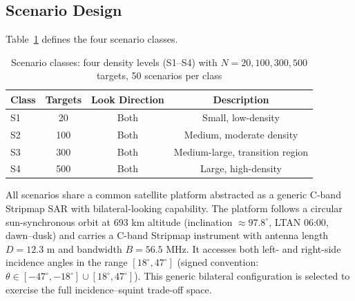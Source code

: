 \documentclass[preprint,12pt,authoryear]{elsarticle}
\begin{document}
\subsection{Scenario Design}
Table~\ref{tab:scenarios} defines the four scenario classes.
\begin{table}[H]
\centering
\caption{Scenario classes: four density levels (S1--S4) with $N = 20, 100, 300, 500$ targets, 50 scenarios per class}
\label{tab:scenarios}
\begin{tabular}{lccc}
\toprule
\textbf{Class} & \textbf{Targets} & \textbf{Look Direction} & \textbf{Description} \\
\midrule
S1 & 20  & Both & Small, low-density \\
S2 & 100  & Both & Medium, moderate density \\
S3 & 300 & Both & Medium-large, transition region \\
S4 & 500 & Both & Large, high-density \\
\bottomrule
\end{tabular}
\end{table}
All scenarios share a common satellite platform abstracted as a generic
C-band Stripmap SAR with bilateral-looking capability. The platform follows
a circular sun-synchronous orbit at 693 km altitude
(inclination \mbox{$\approx 97.8^\circ$}, LTAN 06:00, dawn--dusk) and carries
a C-band Stripmap instrument with antenna length $D = 12.3$ m and bandwidth
$B = 56.5$ MHz. It accesses both left- and right-side incidence angles in
the range $[18^\circ, 47^\circ]$ (signed convention:
$\theta \in [-47^\circ, -18^\circ] \cup [18^\circ, 47^\circ]$). This generic
bilateral configuration is selected to exercise the full incidence--squint
trade-off space.
\end{document}
